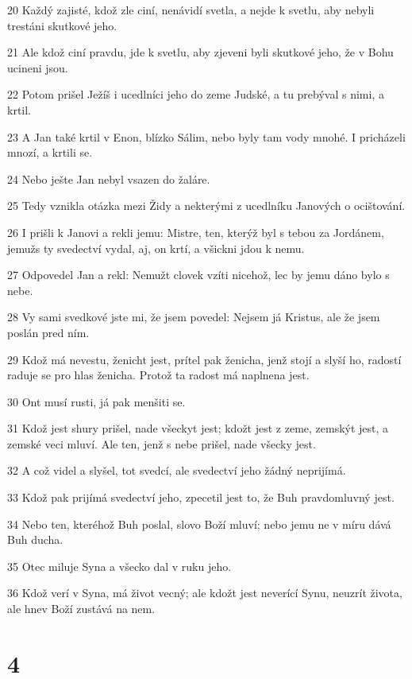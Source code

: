 \par 20 Každý zajisté, kdož zle ciní, nenávidí svetla, a nejde k svetlu, aby nebyli trestáni skutkové jeho.
\par 21 Ale kdož ciní pravdu, jde k svetlu, aby zjeveni byli skutkové jeho, že v Bohu ucineni jsou.
\par 22 Potom prišel Ježíš i ucedlníci jeho do zeme Judské, a tu prebýval s nimi, a krtil.
\par 23 A Jan také krtil v Enon, blízko Sálim, nebo byly tam vody mnohé. I pricházeli mnozí, a krtili se.
\par 24 Nebo ješte Jan nebyl vsazen do žaláre.
\par 25 Tedy vznikla otázka mezi Židy a nekterými z ucedlníku Janových o ocištování.
\par 26 I prišli k Janovi a rekli jemu: Mistre, ten, kterýž byl s tebou za Jordánem, jemužs ty svedectví vydal, aj, on krtí, a všickni jdou k nemu.
\par 27 Odpovedel Jan a rekl: Nemužt clovek vzíti nicehož, lec by jemu dáno bylo s nebe.
\par 28 Vy sami svedkové jste mi, že jsem povedel: Nejsem já Kristus, ale že jsem poslán pred ním.
\par 29 Kdož má nevestu, ženicht jest, prítel pak ženicha, jenž stojí a slyší ho, radostí raduje se pro hlas ženicha. Protož ta radost má naplnena jest.
\par 30 Ont musí rusti, já pak menšiti se.
\par 31 Kdož jest shury prišel, nade všeckyt jest; kdožt jest z zeme, zemskýt jest, a zemské veci mluví. Ale ten, jenž s nebe prišel, nade všecky jest.
\par 32 A což videl a slyšel, tot svedcí, ale svedectví jeho žádný neprijímá.
\par 33 Kdož pak prijímá svedectví jeho, zpecetil jest to, že Buh pravdomluvný jest.
\par 34 Nebo ten, kteréhož Buh poslal, slovo Boží mluví; nebo jemu ne v míru dává Buh ducha.
\par 35 Otec miluje Syna a všecko dal v ruku jeho.
\par 36 Kdož verí v Syna, má život vecný; ale kdožt jest neverící Synu, neuzrít života, ale hnev Boží zustává na nem.

\chapter{4}

